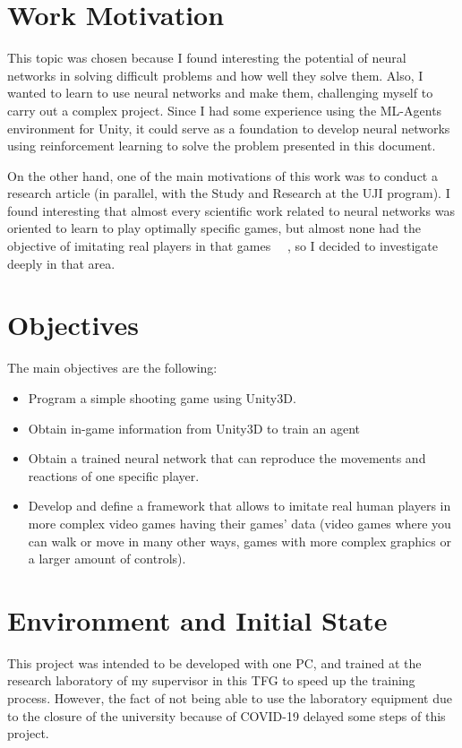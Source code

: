 \section{Work Motivation}

This topic was chosen because I found interesting the potential of neural networks in solving difficult problems and how well they solve them. Also, I wanted to learn to use neural networks and make them, challenging myself to carry out a complex project. Since I had some experience using the ML-Agents environment for Unity, it could serve as a foundation to develop neural networks using reinforcement learning to solve the problem presented in this document.

On the other hand, one of the main motivations of this work was to conduct a research article (in parallel, with the Study and Research at the UJI program). I found interesting that almost every scientific work related to neural networks was oriented to learn to play optimally specific games, but almost none had the objective of imitating real players in that games ~\cite{livingstone}~\cite{nakano}, so I decided to investigate deeply in that area.
\section{Objectives}

The main objectives are the following:
\begin{itemize}
 \item Program a simple shooting game using Unity3D.
 \item Obtain in-game information from Unity3D to train an agent
 \item Obtain a trained neural network that can reproduce the movements and reactions of one specific player.
 \item Develop and define a framework that allows to imitate real human players in more complex video games having their games’ data (video games where you can walk or move in many other ways, games with more complex graphics or a larger amount of controls).
\end{itemize}

\section{Environment and Initial State}
\label{sec:initialstate}

This project was intended to be developed with one PC, and trained at the research laboratory of my supervisor in this TFG to speed up the training process. However, the fact of not being able to use the laboratory equipment due to the closure of the university because of COVID-19 delayed some steps of this project.
